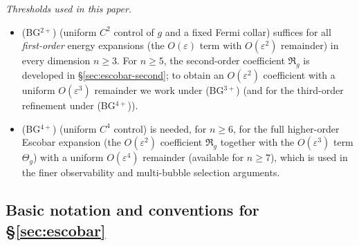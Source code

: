 \documentclass[11pt,reqno,a4paper]{amsart}
\numberwithin{equation}{section}
\newcommand{\Def}{\mathrm{Def}}
\theoremstyle{plain}
\newcommand{\Esc}{\ensuremath{\mathrm{Esc}}}
\theoremstyle{remark}
\theoremstyle{plain}
\begin{document}
\medskip
\noindent\emph{Thresholds used in this paper.}
\begin{itemize}[leftmargin=1.25em]
\item \textup{(BG$^{2+}$)} (uniform $C^2$ control of $g$ and a fixed Fermi collar) suffices for all
\emph{first-order} energy expansions (the $O(\varepsilon)$ term with $O(\varepsilon^2)$ remainder)
in every dimension $n\ge 3$. For $n\ge 5$, the second-order coefficient $\mathfrak R_g$ is developed in \S\ref{sec:escobar-second};
to obtain an $O(\varepsilon^2)$ coefficient with a uniform $O(\varepsilon^3)$ remainder we work under
\textup{(BG$^{3+}$)} (and for the third-order refinement under \textup{(BG$^{4+}$)}).
\item \textup{(BG$^{4+}$)} (uniform $C^4$ control) is needed, for $n\ge 6$, for the full higher-order
Escobar expansion (the $O(\varepsilon^2)$ coefficient $\mathfrak R_g$ together with the
$O(\varepsilon^3)$ term $\Theta_g$) with a uniform $O(\varepsilon^4)$ remainder (available for $n\ge7$), which is used in the
finer observability and multi-bubble selection arguments.
\end{itemize}

\subsection{Basic notation and conventions for \S\ref{sec:escobar}}
\label{subsec:escobar-notation}
\end{document}
